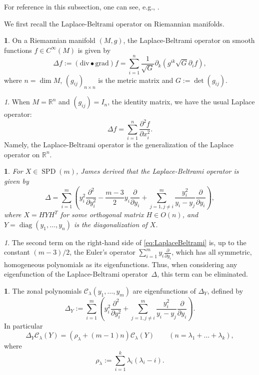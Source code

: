 \documentclass[10pt,oneside,american]{amsart}
\numberwithin{equation}{section}
\numberwithin{figure}{section}
\theoremstyle{plain}
\theoremstyle{definition}
\newtheorem{defn}[thm]{\protect\definitionname}
\theoremstyle{remark}
\newtheorem{rem}[thm]{\protect\remarkname}
\theoremstyle{plain}
\newtheorem{prop}[thm]{\protect\propositionname}
\theoremstyle{definition}
\theoremstyle{plain}
\theoremstyle{plain}
\DeclareMathOperator{\diag}{diag}
\newcommand{\SPD}{\operatorname{SPD}}
\providecommand{\definitionname}{Definition}
\providecommand{\propositionname}{Proposition}
\providecommand{\remarkname}{Remark}
\begin{document}
For reference in this subsection, one can see, e.g., \cite{James1}.

We first recall the Laplace-Beltrami operator on Riemannian manifolds.
\begin{defn}
On a Riemannian manifold $\left(M,g\right)$, the Laplace-Beltrami
operator on smooth functions $f\in C^{\infty}(M)$ is given by 
\[
\Delta f:=\left(\mathrm{div}\bullet\mathrm{grad}\right)f=\sum_{i=1}^{n}\frac{1}{\sqrt{G}}\partial_{k}\left(g^{ik}\sqrt{G}\partial_{i}f\right),
\]
where $n=\dim M$, $\left(g_{ij}\right)_{n\times n}$ is the metric
matrix and $G:=\det\left(g_{ij}\right)$. 
\end{defn}
\begin{rem}
When $M=\mathbb{R}^{n}$ and $\left(g_{ij}\right)=I_{n}$, the identity
matrix, we have the usual Laplace operator:
\[
\Delta f=\sum_{i=1}^{n}\frac{\partial^{2}f}{\partial x_{i}^{2}}.
\]
Namely, the Laplace-Beltrami operator is the generalization of the Laplace
operator on $\mathbb{R}^{n}$. 
\end{rem}
\begin{prop}
For $X\in \SPD(m)$, James \cite[eq.~3.12, p.~1712]{James1} derived
that the Laplace-Beltrami operator is given by
\begin{equation}
\Delta=\sum_{i=1}^{m}\left(y_{i}^{2}\frac{\partial^{2}}{\partial y_{i}^{2}}-\frac{m-3}{2}y_{i}\frac{\partial}{\partial y_{i}}+\sum_{j=1,j\neq i}^{m}\frac{y_{i}^{2}}{y_{i}-y_{j}}\frac{\partial}{\partial y_{i}}\right), \label{eq:LaplaceBeltrami}
\end{equation}
where $X=HYH^{T}$ for some orthogonal matrix $H\in O(n)$, and $Y=\diag(y_{1},\ldots,y_{n})$ is the diagonalization of $X$. 
\end{prop}
\begin{rem}
The second term on the right-hand side of \eqref{eq:LaplaceBeltrami} is, up to the constant $(m-3)/2$,
the Euler's operator $\sum_{i=1}^{m}y_{i}\frac{\partial}{\partial y_{i}}$,
which has all symmetric, homogeneous polynomials as its eigenfunctions.
Thus, when considering any eigenfunction of the Laplace-Beltrami operator~$\Delta$,
this term can be eliminated.
\end{rem}
\begin{defn}
The zonal polynomials $\mathcal{C}_{\lambda}(y_{1},\ldots,y_{m})$
are eigenfunctions of $\Delta_{Y}$, defined by
\[
  \Delta_{Y}:=\sum_{i=1}^{m}\left(y_{i}^{2}\frac{\partial^{2}}{\partial y_{i}^{2}}+\sum_{j=1,j\neq i}^{m}\frac{y_{i}^{2}}{y_{i}-y_{j}}\frac{\partial}{\partial y_{i}}\right).
\]
In particular
\[
  \Delta_{Y}\mathcal{C}_{\lambda}(Y)=\left(\rho_{\lambda}+(m-1)n\right)\mathcal{C}_{\lambda}(Y)
  \qquad (n=\lambda_1+\dots+\lambda_k),
\]
where
\begin{equation}
  \rho_{\lambda}:=\sum_{i=1}^{k}\lambda_{i}\left(\lambda_{i}-i\right).\label{eq:RHO}
\end{equation}
\end{defn}
\end{document}
